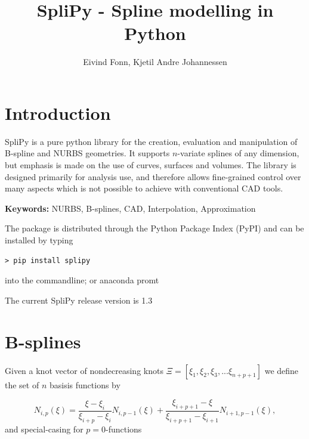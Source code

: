 \documentclass[landscape]{sintefposter}
\title{SpliPy - Spline modelling in Python}
\author{Eivind Fonn, Kjetil Andre Johannessen }
\institute{SINTEF Digital, Dept. of Mathematics and Cybernetics, Trondheim, Norway}
\begin{document}
\maketitle

\begin{multicols}{3}
\section{Introduction}
\begin{tcolorbox}[colback=sintefblue!10!white,colframe=sintefblue,title=Abstract]
  SpliPy is a pure python library for the creation, evaluation and manipulation of B-spline and NURBS geometries.
  It supports $n$-variate splines of any dimension, but emphasis is made on the use of curves, surfaces and volumes.
  The library is designed primarily for analysis use, and therefore allows fine-grained control over many aspects which is not possible to achieve with conventional CAD tools.
\end{tcolorbox}
\textbf{Keywords:} NURBS, B-splines, CAD, Interpolation, Approximation
\vspace{1cm}

\begin{tcolorbox}[colback=white,colframe=sintefblue,title=Installation]
  The package is distributed through the Python Package Index (PyPI) and can be installed by typing
  \begin{tcolorbox}[colback=sinteflightgrey]
  \begin{verbatim}
> pip install splipy \end{verbatim}
  \end{tcolorbox}
  into the commandline; or anaconda promt
\end{tcolorbox}
The current SpliPy release version is 1.3

\section{B-splines}
Given a knot vector of nondecreasing knots $\Xi=[\xi_1, \xi_2, \xi_3, ... \xi_{n+p+1}]$ we define the set of $n$ basisis functions by
\begin{tcolorbox}[colback=sintefblue!10!white,colframe=sintefblue,title=The basis]
  \begin{equation}
    \label{eq:bspline}
    N_{i,p}(\xi) = \frac{\xi - \xi_i}{\xi_{i+p}-\xi_i}N_{i,p-1}(\xi) + \frac{\xi_{i+p+1}-\xi}{\xi_{i+p+1}-\xi_{i+1}}N_{i+1,p-1}(\xi),
  \end{equation}
  and special-casing for $p=0$-functions
\end{tcolorbox}


\end{multicols}
\end{document}
